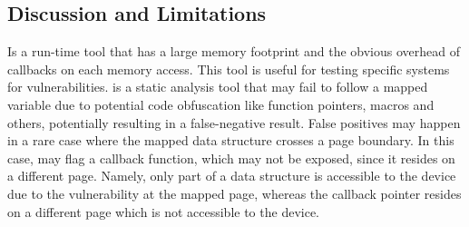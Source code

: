 \subsection{Discussion and Limitations}
\dkasan Is a run-time tool that has a large memory footprint and the obvious overhead of callbacks on each memory access. This tool is useful for testing specific systems for vulnerabilities.
\tool is a static analysis tool that may fail to follow a mapped variable due to potential code obfuscation like function pointers, macros and others, potentially resulting in a false-negative result. False positives may happen in a rare case
where the mapped data structure crosses a  page boundary. In this case, \tool may flag a callback function, which may not be exposed, since it resides on a different page. Namely, only part of a data structure is accessible to the device due to the \subpage{} vulnerability at the mapped page, whereas the callback pointer resides on a different page which is not accessible to the device.%
